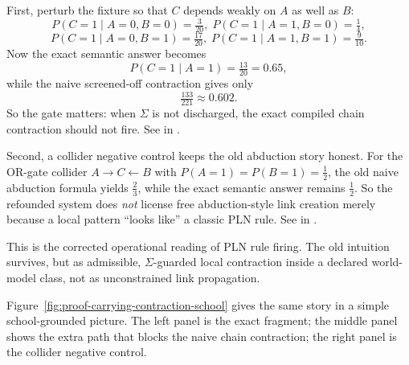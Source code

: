 \documentclass[11pt,openany]{report}
\begin{document}
First, perturb the fixture so that $C$ depends weakly on $A$ as well as
$B$:
\[
  P(C{=}1 \mid A{=}0,B{=}0)=\tfrac3{20},\;
  P(C{=}1 \mid A{=}1,B{=}0)=\tfrac14,
\]
\[
  P(C{=}1 \mid A{=}0,B{=}1)=\tfrac{17}{20},\;
  P(C{=}1 \mid A{=}1,B{=}1)=\tfrac9{10}.
\]
Now the exact semantic answer becomes
\[
  P(C{=}1 \mid A{=}1)=\tfrac{13}{20}=0.65,
\]
while the naive screened-off contraction gives only
\[
  \tfrac{133}{221}\approx 0.602.
\]
So the gate matters: when $\Sigma$ is not discharged, the exact compiled
chain contraction should not fire.  See
 in
.

Second, a collider negative control keeps the old abduction story honest.
For the OR-gate collider $A \to C \leftarrow B$ with
$P(A{=}1)=P(B{=}1)=\tfrac12$, the old naive abduction formula yields
$\tfrac23$, while the exact semantic answer remains $\tfrac12$.  So the
refounded system does \emph{not} license free abduction-style link
creation merely because a local pattern ``looks like'' a classic PLN
rule.  See  in
.

This is the corrected operational reading of PLN rule firing.  The old
intuition survives, but as admissible, $\Sigma$-guarded local contraction
inside a declared world-model class, not as unconstrained link
propagation.

Figure~\ref{fig:proof-carrying-contraction-school} gives the same story in a
simple school-grounded picture.  The left panel is the exact fragment; the
middle panel shows the extra path that blocks the naive chain contraction; the
right panel is the collider negative control.
\end{document}
